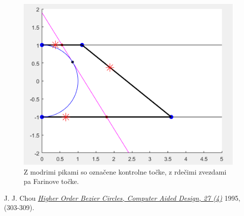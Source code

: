 \documentclass[a4paper,12pt]{article}
\begin{document}
\begin{figure}[h]
\centering
\includegraphics[scale=0.60]{konstrukcija.png}
\caption{Z modrimi pikami so označene kontrolne točke, z rdečimi zvezdami pa Farinove točke.}
\end{figure}




\newpage
\begin{thebibliography}{1}

   J. J. Chou \href{https://www.sciencedirect.com/science/article/pii/001044859591140G}{\em Higher Order Bezier Circles, Computer Aided Design, 27 (4)}  		1995, (303-309).

\end{thebibliography}
\end{document}
